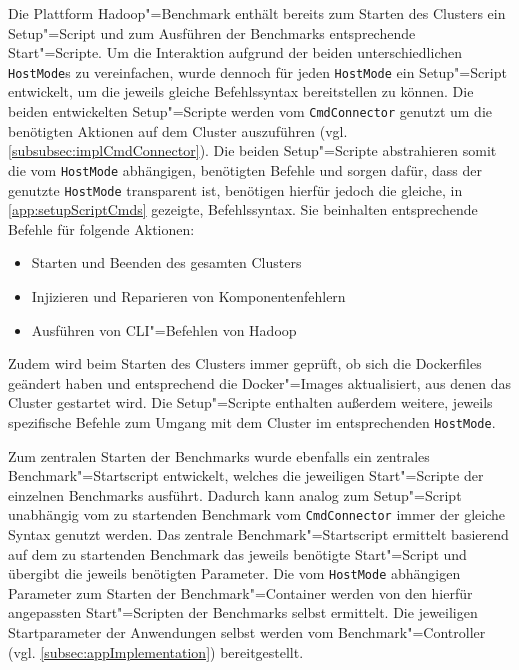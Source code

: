 Die Plattform Hadoop"=Benchmark enthält bereits zum Starten des Clusters ein Setup"=Script und zum Ausführen der Benchmarks entsprechende Start"=Scripte.
Um die Interaktion aufgrund der beiden unterschiedlichen \texttt{HostMode}s zu vereinfachen, wurde dennoch für jeden \texttt{HostMode} ein Setup"=Script entwickelt, um die jeweils gleiche Befehlssyntax bereitstellen zu können.
Die beiden entwickelten Setup"=Scripte werden vom \texttt{CmdConnector} genutzt um die benötigten Aktionen auf dem Cluster auszuführen (vgl. \cref{subsubsec:implCmdConnector}).
Die beiden Setup"=Scripte abstrahieren somit die vom \texttt{HostMode} abhängigen, benötigten Befehle und sorgen dafür, dass der genutzte \texttt{HostMode} transparent ist, benötigen hierfür jedoch die gleiche, in \cref{app:setupScriptCmds} gezeigte, Befehlssyntax.
Sie beinhalten entsprechende Befehle für folgende Aktionen:

\begin{itemize}
    \item Starten und Beenden des gesamten Clusters
    \item Injizieren und Reparieren von Komponentenfehlern
    \item Ausführen von \ac{CLI}"=Befehlen von Hadoop
\end{itemize}

Zudem wird beim Starten des Clusters immer geprüft, ob sich die Dockerfiles geändert haben und entsprechend die Docker"=Images aktualisiert, aus denen das Cluster gestartet wird.
Die Setup"=Scripte enthalten außerdem weitere, jeweils spezifische Befehle zum Umgang mit dem Cluster im entsprechenden \texttt{HostMode}.

Zum zentralen Starten der Benchmarks wurde ebenfalls ein zentrales Benchmark"=Startscript entwickelt, welches die jeweiligen Start"=Scripte der einzelnen Benchmarks ausführt.
Dadurch kann analog zum Setup"=Script unabhängig vom zu startenden Benchmark vom \texttt{CmdConnector} immer der gleiche Syntax genutzt werden.
Das zentrale Benchmark"=Startscript ermittelt basierend auf dem zu startenden Benchmark das jeweils benötigte Start"=Script und übergibt die jeweils benötigten Parameter.
Die vom \texttt{HostMode} abhängigen Parameter zum Starten der Benchmark"=Container werden von den hierfür angepassten Start"=Scripten der Benchmarks selbst ermittelt.
Die jeweiligen Startparameter der Anwendungen selbst werden vom Benchmark"=Controller (vgl. \cref{subsec:appImplementation}) bereitgestellt.
